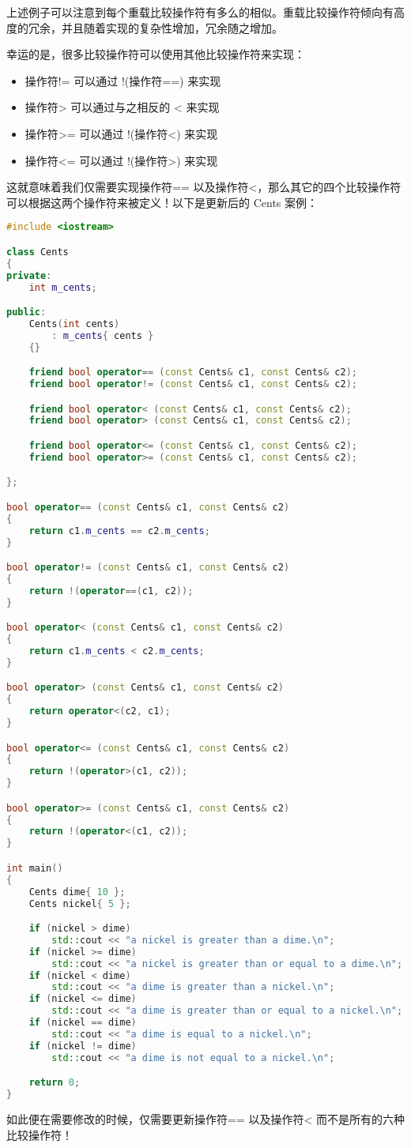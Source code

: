 \documentclass[../../LearnCpp.tex]{subfiles}
\begin{document}
上述例子可以注意到每个重载比较操作符有多么的相似。重载比较操作符倾向有高度的冗余，并且随着实现的复杂性增加，冗余随之增加。

幸运的是，很多比较操作符可以使用其他比较操作符来实现：

\begin{itemize}
  \item 操作符!= 可以通过 !(操作符==) 来实现
  \item 操作符> 可以通过与之相反的 < 来实现
  \item 操作符>= 可以通过 !(操作符<) 来实现
  \item 操作符<= 可以通过 !(操作符>) 来实现
\end{itemize}

这就意味着我们仅需要实现操作符== 以及操作符<，那么其它的四个比较操作符可以根据这两个操作符来被定义！以下是更新后的 Cents 案例：

\begin{lstlisting}[language=C++]
#include <iostream>

class Cents
{
private:
    int m_cents;

public:
    Cents(int cents)
        : m_cents{ cents }
    {}

    friend bool operator== (const Cents& c1, const Cents& c2);
    friend bool operator!= (const Cents& c1, const Cents& c2);

    friend bool operator< (const Cents& c1, const Cents& c2);
    friend bool operator> (const Cents& c1, const Cents& c2);

    friend bool operator<= (const Cents& c1, const Cents& c2);
    friend bool operator>= (const Cents& c1, const Cents& c2);

};

bool operator== (const Cents& c1, const Cents& c2)
{
    return c1.m_cents == c2.m_cents;
}

bool operator!= (const Cents& c1, const Cents& c2)
{
    return !(operator==(c1, c2));
}

bool operator< (const Cents& c1, const Cents& c2)
{
    return c1.m_cents < c2.m_cents;
}

bool operator> (const Cents& c1, const Cents& c2)
{
    return operator<(c2, c1);
}

bool operator<= (const Cents& c1, const Cents& c2)
{
    return !(operator>(c1, c2));
}

bool operator>= (const Cents& c1, const Cents& c2)
{
    return !(operator<(c1, c2));
}

int main()
{
    Cents dime{ 10 };
    Cents nickel{ 5 };

    if (nickel > dime)
        std::cout << "a nickel is greater than a dime.\n";
    if (nickel >= dime)
        std::cout << "a nickel is greater than or equal to a dime.\n";
    if (nickel < dime)
        std::cout << "a dime is greater than a nickel.\n";
    if (nickel <= dime)
        std::cout << "a dime is greater than or equal to a nickel.\n";
    if (nickel == dime)
        std::cout << "a dime is equal to a nickel.\n";
    if (nickel != dime)
        std::cout << "a dime is not equal to a nickel.\n";

    return 0;
}
\end{lstlisting}

如此便在需要修改的时候，仅需要更新操作符== 以及操作符< 而不是所有的六种比较操作符！
\end{document}

